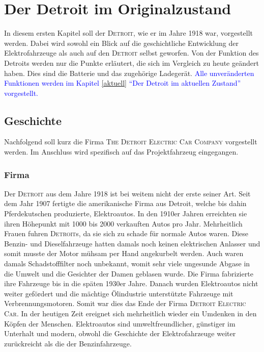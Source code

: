 \chapter{Der Detroit im Originalzustand}
In diesem ersten Kapitel soll der \textsc{Detroit}, wie er im Jahre 1918 war, vorgestellt werden. Dabei wird sowohl ein Blick auf die geschichtliche Entwicklung der Elektrofahrzeuge als auch auf den \textsc{Detroit} selbst geworfen. Von der Funktion des Detroits werden nur die Punkte erläutert, die sich im Vergleich zu heute geändert haben. Dies sind die Batterie und das zugehörige Ladegerät. \textcolor{blue}{Alle unveränderten Funktionen werden im Kapitel \ref{aktuell} "`Der Detroit im aktuellen Zustand"' vorgestellt.}

\section{Geschichte}

Nachfolgend soll kurz die Firma \textsc{The Detroit Electric Car Company} vorgestellt werden. Im Anschluss wird spezifisch auf das Projektfahrzeug eingegangen.

\subsection{Firma}

Der \textsc{Detroit} aus dem Jahre 1918 ist bei weitem nicht der erste seiner Art. Seit dem Jahr 1907 fertigte die amerikanische Firma aus Detroit, welche bis dahin Pferdekutschen produzierte, Elektroautos. In den 1910er Jahren erreichten sie ihren Höhepunkt mit 1000 bis 2000 verkauften Autos pro Jahr. Mehrheitlich Frauen fuhren \textsc{Detroit}s, da sie sich zu schade für normale Autos waren. Diese Benzin- und Dieselfahrzeuge hatten damals noch keinen elektrischen Anlasser und somit musste der Motor mühsam per Hand angekurbelt werden. Auch waren damals Schadstofffilter noch unbekannt, womit sehr viele ungesunde Abgase in die Umwelt und die Gesichter der Damen geblasen wurde. Die Firma fabrizierte ihre Fahrzeuge bis in die späten 1930er Jahre. Danach wurden Elektroautos nicht weiter gefördert und die mächtige Ölindustrie unterstützte Fahrzeuge mit Verbrennungsmotoren. Somit war dies das Ende der Firma \textsc{Detroit Electric Car}.
In der heutigen Zeit ereignet sich mehrheitlich wieder ein Umdenken in den Köpfen der Menschen. Elektroautos sind umweltfreundlicher, günstiger im Unterhalt und modern, obwohl die Geschichte der Elektrofahrzeuge weiter zurückreicht als die der Benzinfahrzeuge.

